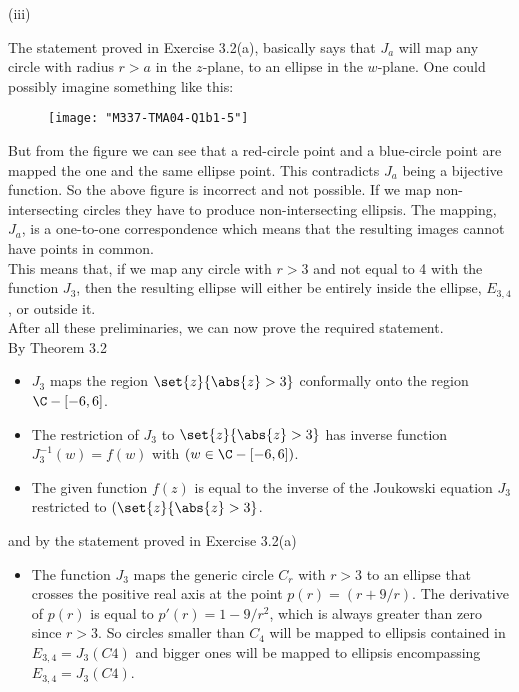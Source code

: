 \documentclass[english,a4paper,11pt]{scrartcl}
\begin{document}
\begin{labeling}{(iii) }
  
The statement proved in Exercise 3.2(a), basically says that $J_a$ will map any circle with radius $r > a$ in the $z$-plane, to an ellipse in the $w$-plane. One could possibly imagine something like this:

\begin{figure}[H]
  	\centering
  	\texttt{[image: "M337-TMA04-Q1b1-5"]}
  \end{figure}  
 
But from the figure we can see that a red-circle point and a blue-circle point are mapped the one and the same ellipse point. This contradicts $J_a$ being a bijective function. So the above figure is incorrect and not possible. If we map non-intersecting circles they have to produce non-intersecting ellipsis. The mapping, $J_a$, is a one-to-one correspondence which means that the resulting images cannot have points in common.\\

This means that, if we map any circle with $r > 3$ and not equal to 4 with the function $J_3$, then the resulting ellipse will either be entirely inside the ellipse, $E_{3,4}$, or outside it.\\

After all these preliminaries, we can now prove the required statement.\\

By Theorem 3.2

\begin{itemize}
\item $J_3$ maps the region $\set{z}{\abs{z}> 3}$ conformally onto the
region $\C - [-6,6]$. \\ 

\item The restriction of $J_3$ to $\set{z}{\abs{z} > 3}$ has inverse function $J^{-1}_3(w) = f(w)$ with $(w \in \C - [-6,6])$. \\ 

\item The given function $f(z)$ is equal to the inverse of the Joukowski equation $J_3$ restricted to $(\set{z}{\abs{z} > 3}$. \\

\end{itemize}

and by the statement proved in Exercise 3.2(a)

\begin{itemize}

\item The function $J_3$ maps the generic circle $C_r$ with $r> 3$ to an ellipse that crosses the positive real axis at the point $p(r) = (r + 9/r)$. The derivative of $p(r)$ is equal to  $p'(r) = 1 - 9/r^2$, which is always greater than zero since $r>3$. So circles smaller than $C_4$ will be mapped to ellipsis contained in $E_{3,4} = J_3(C4)$ and bigger ones will be mapped to ellipsis encompassing $E_{3,4} = J_3(C4)$.\\


\end{itemize}
\end{labeling}
\end{document}
